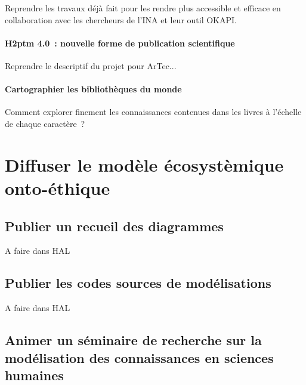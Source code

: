 \documentclass[
  letterpaper,
  DIV=11,
  numbers=noendperiod]{scrreprt}
\begin{document}
Reprendre les travaux déjà fait pour les rendre plus accessible et
efficace en collaboration avec les chercheurs de l'INA et leur outil
OKAPI.

\hypertarget{h2ptm-4.0-nouvelle-forme-de-publication-scientifique}{%
\subsubsection{H2ptm 4.0~: nouvelle forme de publication
scientifique}\label{h2ptm-4.0-nouvelle-forme-de-publication-scientifique}}

Reprendre le descriptif du projet pour ArTec...

\hypertarget{cartographier-les-bibliothuxe8ques-du-monde}{%
\subsubsection{Cartographier les bibliothèques du
monde}\label{cartographier-les-bibliothuxe8ques-du-monde}}

Comment explorer finement les connaissances contenues dans les livres à
l'échelle de chaque caractère~?

\hypertarget{section}{%
\subsubsection{}\label{section}}

\hypertarget{sec-diffuser}{%
\chapter{Diffuser le modèle écosystèmique
onto-éthique}\label{sec-diffuser}}

\hypertarget{publier-un-recueil-des-diagrammes}{%
\section{Publier un recueil des
diagrammes}\label{publier-un-recueil-des-diagrammes}}

A faire dans HAL

\hypertarget{publier-les-codes-sources-de-moduxe9lisations}{%
\section{Publier les codes sources de
modélisations}\label{publier-les-codes-sources-de-moduxe9lisations}}

A faire dans HAL

\hypertarget{animer-un-suxe9minaire-de-recherche-sur-la-moduxe9lisation-des-connaissances-en-sciences-humaines}{%
\section{Animer un séminaire de recherche sur la modélisation des
connaissances en sciences
humaines}\label{animer-un-suxe9minaire-de-recherche-sur-la-moduxe9lisation-des-connaissances-en-sciences-humaines}}
\end{document}
